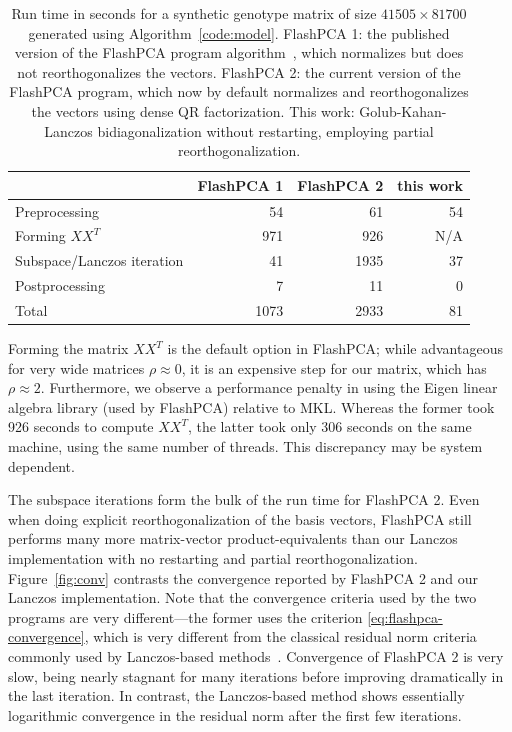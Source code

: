 \documentclass[review]{siamart0516}
\begin{document}
\begin{table}
    \caption{Run time in seconds for a synthetic genotype matrix of
    size $41505\times81700$ generated using Algorithm~\ref{code:model}.
    FlashPCA 1: the published version of the FlashPCA program
    algorithm~\cite{abraham2014fast}, which normalizes but does not reorthogonalizes
    the vectors. FlashPCA 2: the current version of the FlashPCA program,
    which now by default normalizes and reorthogonalizes the vectors using dense
    QR factorization. This work: Golub-Kahan-Lanczos bidiagonalization without
    restarting, employing partial reorthogonalization.
    \label{tab:runtime}
    }
    \centering
    \begin{tabular}{lrrr}
                                   & FlashPCA 1 & FlashPCA 2   & this work     \\ \hline
        Preprocessing              &   54        &   61        & 54            \\
        Forming $XX^T$             &  971        &  926        & N/A           \\
        Subspace/Lanczos iteration &   41        & 1935        & 37            \\
        Postprocessing             &    7        &   11        & 0             \\ \hline
        Total                      & 1073        & 2933        & 81  \\ \hline
    \end{tabular}
\end{table}


Forming the matrix $XX^T$ is the default option in FlashPCA; while advantageous
for very wide matrices $\rho \approx 0$, it is an expensive step for our matrix,
which has $\rho \approx 2$.
Furthermore, we observe a performance penalty in using the Eigen linear algebra
library (used by FlashPCA) relative to MKL.
Whereas the former took 926 seconds to compute $XX^T$, the latter took only
306 seconds on the same machine, using the same number of threads.
This discrepancy may be system dependent.

The subspace iterations form the bulk of the run time for FlashPCA 2. Even when
doing explicit reorthogonalization of the basis vectors, FlashPCA still performs
many more matrix-vector product-equivalents than our Lanczos implementation with
no restarting and partial reorthogonalization. Figure~\ref{fig:conv} contrasts
the convergence reported by FlashPCA 2 and our Lanczos implementation. Note that
the convergence criteria used by the two programs are very different---the former
uses the criterion \eqref{eq:flashpca-convergence}, which is very different from
the classical residual norm criteria commonly used by Lanczos-based
methods~\cite{Parlett1998}. Convergence of FlashPCA 2 is very slow,
being nearly stagnant for many iterations before improving dramatically
in the last iteration. In contrast, the Lanczos-based method shows essentially
logarithmic convergence in the residual norm after the first few iterations.
\end{document}
